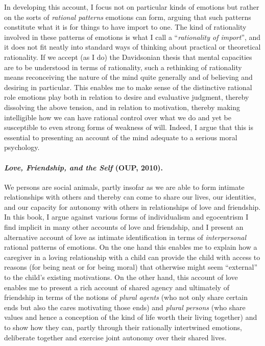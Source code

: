 \documentclass[%
  11pt,%
]{article}
\begin{document}
In developing this account, I focus not on particular kinds of emotions but rather on the sorts of \emph{rational patterns} emotions can form, arguing that such patterns constitute what it is for things to have import to one. The kind of rationality involved in these patterns of emotions is what I call a \enquote{\emph{rationality of import}}, and it does not fit neatly into standard ways of thinking about practical or theoretical rationality. If we accept (as I do) the Davidsonian thesis that mental capacities are to be understood in terms of rationality, such a rethinking of rationality means reconceiving the nature of the mind quite generally and of believing and desiring in particular. This enables me to make sense of the distinctive rational role emotions play both in relation to desire and evaluative judgment, thereby dissolving the above tension, and in relation to motivation, thereby making intelligible how we can have rational control over what we do and yet be susceptible to even strong forms of weakness of will. Indeed, I argue that this is essential to presenting an account of the mind adequate to a serious moral psychology.

\paragraph{\emph{Love, Friendship, and the Self} (OUP, 2010).}

We persons are social animals, partly insofar as we are able to form intimate relationships with others and thereby can come to share our lives, our identities, and our capacity for autonomy with others in relationships of love and friendship. In this book, I argue against various forms of individualism and egocentrism I find implicit in many other accounts of love and friendship, and I present an alternative account of love as intimate identification in terms of \emph{interpersonal} rational patterns of emotions. On the one hand this enables me to explain how a caregiver in a loving relationship with a child can provide the child with access to reasons (for being neat or for being moral) that otherwise might seem \enquote{external} to the child's existing motivations. On the other hand, this account of love enables me to present a rich account of shared agency and ultimately of friendship in terms of the notions of \emph{plural agents} (who not only share certain ends but also the cares motivating those ends) and \emph{plural persons} (who share values and hence a conception of the kind of life worth their living together) and to show how they can, partly through their rationally intertwined emotions, deliberate together and exercise joint autonomy over their shared lives.
\end{document}
